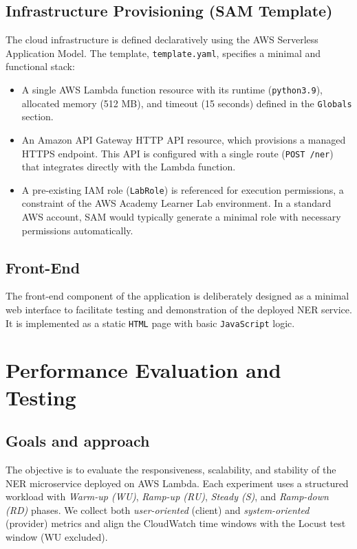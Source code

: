 \documentclass[11pt,a4paper]{article}
\begin{document}
\subsection{Infrastructure Provisioning (SAM Template)}
The cloud infrastructure is defined declaratively using the AWS Serverless Application Model. The template, \texttt{template.yaml}, specifies a minimal and functional stack:
\begin{itemize}
    \item A single AWS Lambda function resource with its runtime (\texttt{python3.9}), allocated memory (512 MB), and timeout (15 seconds) defined in the \texttt{Globals} section.
    \item An Amazon API Gateway HTTP API resource, which provisions a managed HTTPS endpoint. This API is configured with a single route (\texttt{POST /ner}) that integrates directly with the Lambda function.
    \item A pre-existing IAM role (\texttt{LabRole}) is referenced for execution permissions, a constraint of the AWS Academy Learner Lab environment. In a standard AWS account, SAM would typically generate a minimal role with necessary permissions automatically.
\end{itemize}

\subsection{Front-End}
The front-end component of the application is deliberately designed as a minimal web interface to facilitate testing and demonstration of the deployed NER service. It is implemented as a static \texttt{HTML} page with basic \texttt{JavaScript} logic. 
\section{Performance Evaluation and Testing}\label{sec:testing}

\subsection{Goals and approach}
The objective is to evaluate the responsiveness, scalability, and stability of the NER microservice deployed on AWS Lambda. Each experiment uses a structured workload with \emph{Warm-up (WU)}, \emph{Ramp-up (RU)}, \emph{Steady (S)}, and \emph{Ramp-down (RD)} phases. We collect both \emph{user-oriented} (client) and \emph{system-oriented} (provider) metrics and align the CloudWatch time windows with the Locust test window (WU excluded).
\end{document}
